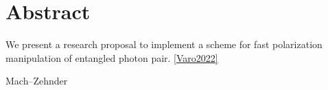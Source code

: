 \chapter*{Abstract}

We present a research proposal to implement a scheme for fast polarization manipulation of entangled photon pair.
\ref{Varo2022}


	Mach–Zehnder


